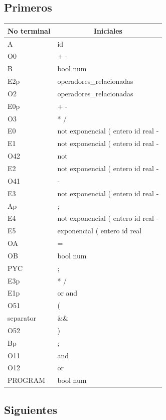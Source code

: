 \documentclass{article}
\begin{document}
\subsection{Primeros}
\begin{tabular}{|l|l|}
	\hline
	\multicolumn{1}{|c|}{No terminal} & \multicolumn{1}{c|}{Iniciales} \\ \hline
A	&	id \\ \hline
O0	&	+ - \\ \hline
B	&	bool num \\ \hline
E2p	&	operadores\_relacionadas \\ \hline
O2	&	operadores\_relacionadas \\ \hline
E0p	&	+ - \\ \hline
O3	&	* / \\ \hline
E0	&	not exponencial ( entero id real - \\ \hline
E1	&	not exponencial ( entero id real - \\ \hline
O42	&	not \\ \hline
E2	&	not exponencial ( entero id real - \\ \hline
O41	&	- \\ \hline
E3	&	not exponencial ( entero id real - \\ \hline
Ap	&	; \\ \hline
E4	&	not exponencial ( entero id real - \\ \hline
E5	&	exponencial ( entero id real \\ \hline
OA	&	= \\ \hline
OB	&	bool num \\ \hline
PYC	&	; \\ \hline
E3p	&	* / \\ \hline
E1p	&	or and \\ \hline
O51	&	( \\ \hline
separator	& \&\& \\ \hline
O52	&	) \\ \hline
Bp	&	; \\ \hline
O11	&	and \\ \hline
O12	&	or \\ \hline
PROGRAM	&	bool num \\ \hline
\end{tabular}

\subsection{Siguientes}
\end{document}
